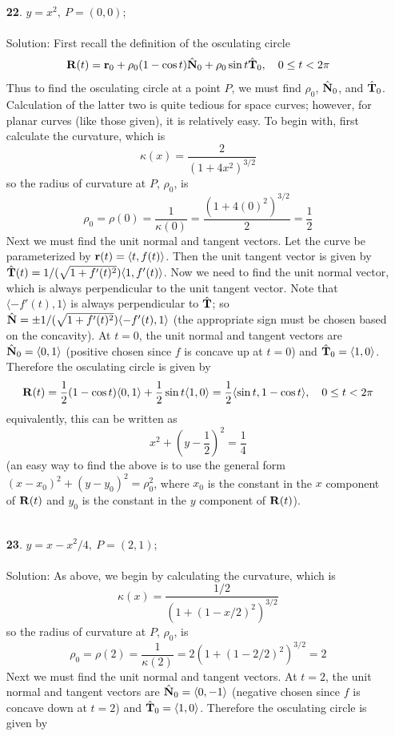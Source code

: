 \documentclass[12pt]{amsbook}
\newcommand{\la}{\langle}
\newcommand{\ra}{\rangle}
\begin{document}
\begin{enumerate}
  \item[{\small\bf 22}.] $y=x^2, \ P=(0,0)$;
  \\
  \\
  {\sc Solution}: First recall the definition of the osculating circle
  $${\bf R}(t)={\bf r}_0+\rho_0(1-\cos t)\hat{\bf N}_0+\rho_0\sin t\hat{\bf T}_0, \ \ \ 0\leq t <2\pi$$
  Thus to find the osculating circle at a point $P$, we must find $\rho_0$, $\hat{\bf N}_0$, and $\hat{\bf T}_0$. Calculation of the latter two is quite tedious for space curves; however, for planar curves (like those given), it is relatively easy. To begin with, first calculate the curvature, which is
  $$\kappa(x)=\frac{2}{(1+4x^2)^{3/2}}$$
  so the radius of curvature at $P$, $\rho_0$, is
  $$\rho_0=\rho(0)=\frac{1}{\kappa(0)}=\frac{(1+4(0)^2)^{3/2}}{2}=\frac{1}{2}$$
  Next we must find the unit normal and tangent vectors. Let the curve be parameterized by ${\bf r}(t)=\la t,f(t) \ra$. Then the unit tangent vector is given by $\hat{\bf T}(t)=1/(\sqrt{1+f'(t)^2})\la 1,f'(t) \ra$. Now we need to find the unit normal vector, which is always perpendicular to the unit tangent vector. Note that $\la -f'(t),1 \ra$ is always perpendicular to $\hat{\bf T}$; so $\hat{\bf N}=\pm1/(\sqrt{1+f'(t)^2})\la -f'(t),1 \ra$ (the appropriate sign must be chosen based on the concavity). At $t=0$, the unit normal and tangent vectors are $\hat{\bf N}_0=\la 0,1 \ra$ (positive chosen since $f$ is concave up at $t=0$) and $\hat{\bf T}_0=\la 1,0 \ra$. Therefore the osculating circle is given by
  $${\bf R}(t)=\frac{1}{2}(1-\cos t)\la 0,1 \ra+\frac{1}{2}\sin t \la 1,0 \ra = \frac{1}{2}\la \sin t, 1-\cos t \ra, \ \ \ 0\leq t <2\pi$$
  equivalently, this can be written as
  $$x^2+(y-\frac{1}{2})^2=\frac{1}{4}$$
  (an easy way to find the above is to use the general form $(x-x_0)^2+(y-y_0)^2=\rho_0^2$, where $x_0$ is the constant in the $x$ component of ${\bf R}(t)$ and $y_0$ is the constant in the $y$ component of ${\bf R}(t)$). 
  \\
  \\
  \item[{\small\bf 23}.] $y=x-x^2/4, \ P=(2,1)$;
  \\
  \\
  {\sc Solution}: As above, we begin by calculating the curvature, which is
  $$\kappa(x)=\frac{1/2}{(1+(1-x/2)^2)^{3/2}}$$
  so the radius of curvature at $P$, $\rho_0$, is
  $$\rho_0=\rho(2)=\frac{1}{\kappa(2)}=2(1+(1-2/2)^2)^{3/2}=2$$
  Next we must find the unit normal and tangent vectors. At $t=2$, the unit normal and tangent vectors are $\hat{\bf N}_0=\la 0,-1 \ra$ (negative chosen since $f$ is concave down at $t=2$) and $\hat{\bf T}_0=\la 1,0 \ra$. Therefore the osculating circle is given by

\end{enumerate}
\end{document}
